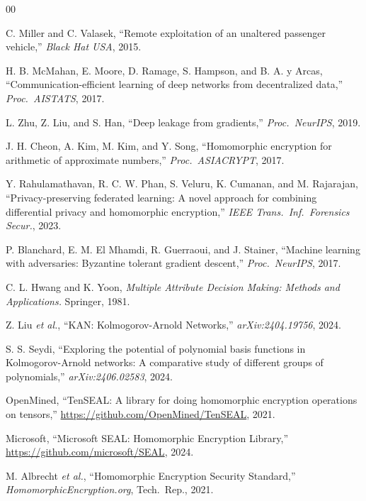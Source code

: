 \documentclass[conference]{IEEEtran}
\begin{document}
\begin{thebibliography}{00}

C. Miller and C. Valasek,
``Remote exploitation of an unaltered passenger vehicle,''
\textit{Black Hat USA}, 2015.

H. B. McMahan, E. Moore, D. Ramage, S. Hampson, and B. A. y Arcas,
``Communication-efficient learning of deep networks from decentralized data,''
\textit{Proc.\ AISTATS}, 2017.

L. Zhu, Z. Liu, and S. Han,
``Deep leakage from gradients,''
\textit{Proc.\ NeurIPS}, 2019.

J. H. Cheon, A. Kim, M. Kim, and Y. Song,
``Homomorphic encryption for arithmetic of approximate numbers,''
\textit{Proc.\ ASIACRYPT}, 2017.

Y. Rahulamathavan, R. C. W. Phan, S. Veluru, K. Cumanan, and M. Rajarajan,
``Privacy-preserving federated learning: A novel approach for combining
differential privacy and homomorphic encryption,''
\textit{IEEE Trans.\ Inf.\ Forensics Secur.}, 2023.

P. Blanchard, E. M. El Mhamdi, R. Guerraoui, and J. Stainer,
``Machine learning with adversaries: Byzantine tolerant gradient descent,''
\textit{Proc.\ NeurIPS}, 2017.

C. L. Hwang and K. Yoon,
\textit{Multiple Attribute Decision Making: Methods and Applications.}
Springer, 1981.

Z. Liu \textit{et al.},
``KAN: Kolmogorov-Arnold Networks,''
\textit{arXiv:2404.19756}, 2024.

S. S. Seydi,
``Exploring the potential of polynomial basis functions in Kolmogorov-Arnold
networks: A comparative study of different groups of polynomials,''
\textit{arXiv:2406.02583}, 2024.

OpenMined,
``TenSEAL: A library for doing homomorphic encryption operations on tensors,''
\url{https://github.com/OpenMined/TenSEAL}, 2021.

Microsoft,
``Microsoft SEAL: Homomorphic Encryption Library,''
\url{https://github.com/microsoft/SEAL}, 2024.

M. Albrecht \textit{et al.},
``Homomorphic Encryption Security Standard,''
\textit{HomomorphicEncryption.org}, Tech.\ Rep., 2021.


\end{thebibliography}
\end{document}

